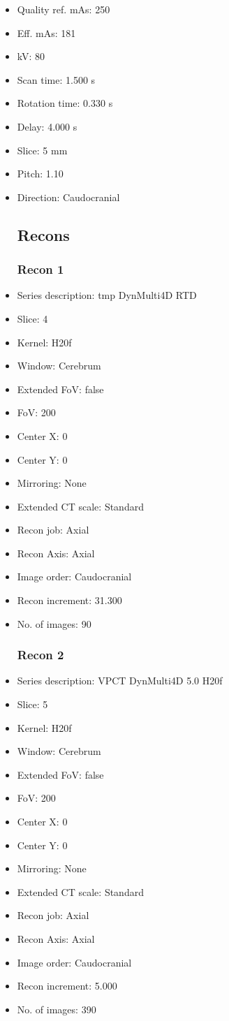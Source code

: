 \documentclass[12pt]{article}
\begin{document}
\begin{itemize}
\subsection{Scan}
\item Quality ref. mAs: 250\item Eff. mAs: 181\item kV: 80\item Scan time: 1.500 s\item Rotation time: 0.330 s\item Delay: 4.000 s\item Slice: 5 mm\item Pitch: 1.10\item Direction: Caudocranial\subsection{Recons}

\subsubsection{Recon 1}
\item Series description: tmp DynMulti4D RTD
\item Slice: 4
\item Kernel: H20f
\item Window: Cerebrum
\item Extended FoV: false
\item FoV: 200
\item Center X: 0
\item Center Y: 0
\item Mirroring: None
\item Extended CT scale: Standard
\item Recon job: Axial
\item Recon Axis: Axial
\item Image order: Caudocranial
\item Recon increment: 31.300
\item No. of images: 90
\subsubsection{Recon 2}
\item Series description: VPCT DynMulti4D 5.0 H20f
\item Slice: 5
\item Kernel: H20f
\item Window: Cerebrum
\item Extended FoV: false
\item FoV: 200
\item Center X: 0
\item Center Y: 0
\item Mirroring: None
\item Extended CT scale: Standard
\item Recon job: Axial
\item Recon Axis: Axial
\item Image order: Caudocranial
\item Recon increment: 5.000
\item No. of images: 390
\end{itemize}
\end{document}
